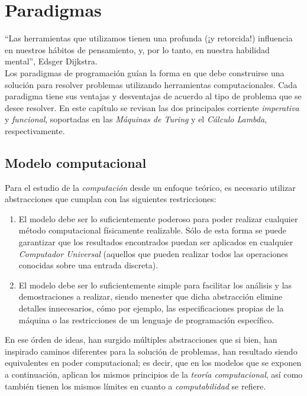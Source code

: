 
\chapter{Paradigmas}

``Las herramientas que utilizamos tienen una profunda (¡y retorcida!) influencia en nuestros hábitos de pensamiento, y, por lo tanto, en nuestra habilidad mental'', Edsger Dijkstra. \\

Los paradigmas de programación guían la forma en que debe construirse una solución para resolver problemas utilizando herramientas computacionales. Cada paradigma tiene sus ventajas y desventajas de acuerdo al tipo de problema que se desee resolver. En este capítulo se revisan las dos principales corriente \emph{imperativa} y \emph{funcional}, soportadas en las \emph{Máquinas de Turing} y el \emph{Cálculo Lambda}, respectivamente.\\

\section{Modelo computacional}

Para el estudio de la \emph{computación} desde un enfoque teórico, es necesario utilizar abstracciones que cumplan con las siguientes restricciones:

\begin{enumerate}
	\item El modelo debe ser lo suficientemente poderoso para poder realizar cualquier método computacional físicamente realizable. Sólo de esta forma se puede garantizar que los resultados encontrados puedan ser aplicados en cualquier \emph{Computador Universal} (aquellos que pueden realizar todos las operaciones conocidas sobre una entrada discreta).
	\item El modelo debe ser lo suficientemente simple para facilitar los análisis y las demostraciones a realizar, siendo menester que dicha abstracción elimine detalles innecesarios, cómo por ejemplo, las especificaciones propias de la máquina o las restricciones de un lenguaje de programación específico.
\end{enumerate}  

En ese órden de ideas, han surgido múltiples abstracciones que si bien, han inspirado caminos diferentes para la solución de problemas, han resultado siendo equivalentes en poder computacional; es decir, que en los modelos que se exponen a continuación, aplican los mismos principios de la \emph{teoría computacional}, así como también tienen los mismos límites en cuanto a \emph{computabilidad} se refiere.
\newpage
